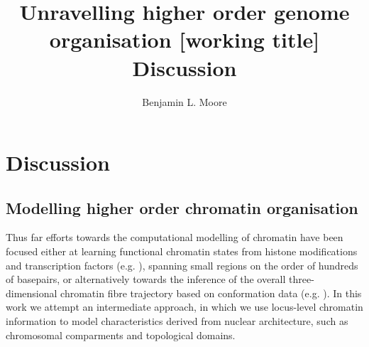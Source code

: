 \documentclass[a4paper,11pt,oneside]{book}
\title{ \vspace{3in} Unravelling higher order genome organisation {\small [working
    title]} \\ \vspace{2em} {\large {\bf Discussion}} }
\author{Benjamin L. Moore}
\begin{document}

\chapter{Discussion}

%
%

\section{Modelling higher order chromatin organisation}

Thus far efforts towards the computational modelling of chromatin have been focused either at learning functional chromatin states from histone modifications and transcription factors (e.g. ), spanning small regions on the order of hundreds of basepairs, or alternatively towards the inference of the overall three-dimensional chromatin fibre trajectory based on conformation data (e.g. ). In this work we attempt an intermediate approach, in which we use locus-level chromatin information to model characteristics derived from nuclear architecture, such as chromosomal comparments and topological domains.
\end{document}

